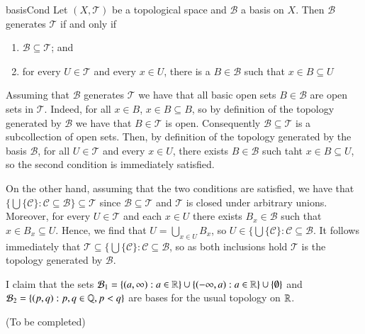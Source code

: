 \documentclass[12pt, a4paper, twoside, openright, titlepage]{book}
\begin{document}
\begin{cor}{}{basisCond}
    Let $(X,\mathcal{T})$ be a topological space and $\mathcal{B}$ a basis on $X$. Then $\mathcal{B}$ generates $\mathcal{T}$ if and only if \begin{enumerate}
        \item $\mathcal{B}\subseteq \mathcal{T}$; and 
        \item for every $U \in \mathcal{T}$ and every $x \in U$, there is a $B \in \mathcal{B}$ such that $x \in B\subseteq U$
    \end{enumerate}
\end{cor}
\begin{proof*}{}{}

    Assuming that $\mathcal{B}$ generates $\mathcal{T}$ we have that all basic open sets $B \in \mathcal{B}$ are open sets in $\mathcal{T}$. Indeed, for all $x \in B$, $x \in B \subseteq B$, so by definition of the topology generated by $\mathcal{B}$ we have that $B \in \mathcal{T}$ is open. Consequently $\mathcal{B} \subseteq \mathcal{T}$ is a subcollection of open sets. Then, by definition of the topology generated by the basis $\mathcal{B}$, for all $U \in \mathcal{T}$ and every $x \in U$, there exists $B \in \mathcal{B}$ such taht $x \in B\subseteq U$, so the second condition is immediately satisfied.


    On the other hand, assuming that the two conditions are satisfied, we have that $\{\bigcup\{\mathcal{C}\}:\mathcal{C}\subseteq \mathcal{B}\} \subseteq \mathcal{T}$ since $\mathcal{B}\subseteq \mathcal{T}$ and $\mathcal{T}$ is closed under arbitrary unions. Moreover, for every $U \in \mathcal{T}$ and each $x \in U$ there exists $B_x \in \mathcal{B}$ such that $x \in B_x \subseteq U$. Hence, we find that $U = \bigcup_{x \in U}B_x$, so $U \in \{\bigcup\{\mathcal{C}\}:\mathcal{C}\subseteq\mathcal{B}$. It follows immediately that $\mathcal{T} \subseteq \{\bigcup\{\mathcal{C}\}:\mathcal{C}\subseteq\mathcal{B}$, so as both inclusions hold $\mathcal{T}$ is the topology generated by $\mathcal{B}$.
\end{proof*}

\begin{xca*}{}{}
    I claim that the sets $\mathcal{B}_1 = \{(a,\infty): a\in \mathbb R\}\cup\{(-\infty,a):a\in\mathbb R\}\cup\{\emptyset\}$ and $\mathcal{B}_2 = \{(p,q):p,q\in\mathbb Q, p < q\}$ are bases for the usual topology on $\mathbb R$.
\end{xca*}
\begin{proof*}{}{}
    (To be completed)
\end{proof*}
\end{document}
